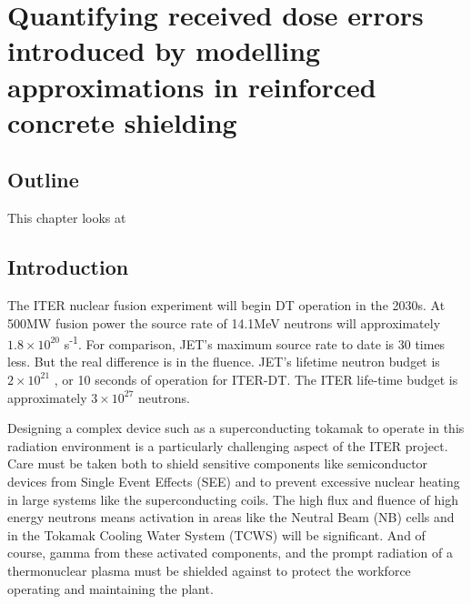 
\chapter{Quantifying received dose errors introduced by modelling approximations in reinforced concrete shielding}
\label{chap:homogenisation}

\ifpdf
    \graphicspath{{Chapter2/Figs/Raster/}{Chapter2/Figs/PDF/}{Chapter2/Figs/}}
\else
    \graphicspath{{Chapter2/Figs/Vector/}{Chapter2/Figs/}}
\fi


\section{Outline}
This chapter looks at %

\section{Introduction}
The ITER nuclear fusion experiment will begin DT operation in the 2030s. At 500MW fusion power the source rate of 14.1MeV neutrons will approximately $1.8\times10^{20}$ s\textsuperscript{-1}. For comparison, JET's maximum source rate to date is 30 times less. But the real difference is in the fluence. JET's lifetime neutron budget is $2\times10^{21}$ \cite{Lobel08}, or 10 seconds of operation for ITER-DT. The ITER life-time budget is approximately $3\times10^{27}$ neutrons.

Designing a complex device such as a superconducting tokamak to operate in this radiation environment is a particularly challenging aspect of the ITER project. Care must be taken both to shield sensitive components like semiconductor devices from Single Event Effects (SEE) and to prevent excessive nuclear heating in large systems like the superconducting coils. The high flux and fluence of high energy neutrons means activation in areas like the Neutral Beam (NB) cells and in the Tokamak Cooling Water System (TCWS) will be significant. And of course, gamma from these activated components, and the prompt radiation of a thermonuclear plasma must be shielded against to protect the workforce operating and maintaining the plant.

